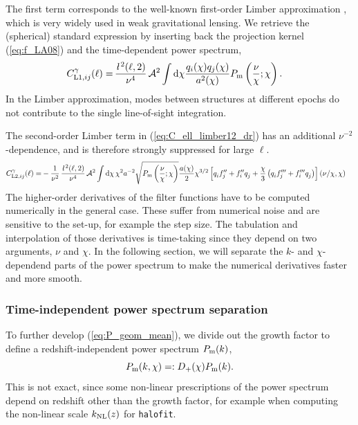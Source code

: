 \documentclass[useAMS,usenatbib]{mn2e} %
\newcommand{\ellbar}{\hbox{\it \l}\,}
\newcommand{\pref}{{\cal A}}
\begin{document}
%
The first term corresponds to the well-known first-order Limber approximation
\cite{1953ApJ...117..134L,1992ApJ...388..272K}, which is very widely used in
weak gravitational lensing. We retrieve the (spherical) standard expression by
inserting back the projection kernel (\ref{eq:f_LA08}) and the time-dependent
power spectrum,
%
\begin{align}
  C^\gamma_{{\rm L1}, ij}(\ell) = & \, \frac{\ellbar^2(\ell, 2)}{\nu^4} \, \pref^2 \int {\rm d} \chi \frac{ q_i(\chi) q_j(\chi) }{a^2(\chi)}
  P_{\rm m}\left(\frac{\nu}{\chi}; \chi\right).
  \label{eq:C_ell_limber1}
\end{align}
%
In the Limber approximation, modes between structures at different epochs do
not contribute to the single line-of-sight integration.

The second-order Limber term in (\ref{eq:C_ell_limber12_dr}) has an additional
$\nu^{-2}$-dependence, and is therefore strongly suppressed for large $\ell$.
%
\begin{align}
  C^\gamma_{{\rm L2}, ij}(\ell) = & - \frac 1 {\nu^2} \, \frac{\ellbar^2(\ell, 2)}{\nu^4} \, \pref^2
    \int {\rm d} \chi \, \chi^{2} a^{-2} \sqrt{P_{\rm m}\left(\frac\nu\chi; \chi\right)}
    \frac{a(\chi)}{2} \chi^{3/2} \left[ q^{}_i f^{\prime\prime}_j + f^{\prime\prime}_i q^{}_j
      + \frac{\chi}{3} \left( q^{}_i f^{\prime\prime\prime}_j + f^{\prime\prime\prime}_i q^{}_j
      \right)
    \right](\nu/\chi, \chi)
  \label{eq:C_ell_limber2_dr} 
\end{align}
%
The higher-order derivatives of the filter functions have to be computed
numerically in the general case. These suffer from numerical noise and are
sensitive to the set-up, for example the step size. The tabulation and
interpolation of those derivatives is time-taking since they depend on two
arguments, $\nu$ and $\chi$. In the following section, we will separate the
$k$- and $\chi$-dependend parts of the power spectrum to make the numerical
derivatives faster and more smooth.

\subsubsection{Time-independent power spectrum separation}

To further develop (\ref{eq:P_geom_mean}), we divide out the growth factor to
define a redshift-independent power spectrum $P_{\rm m}(k)$,
%
\begin{equation}
 P_{\rm m}(k, \chi) =: D_+(\chi) P_{\rm m}(k).
  \label{eq:P_k_chi_sep_s}
\end{equation}
%
This is not exact, since some non-linear prescriptions of the power spectrum
depend on redshift other than the growth factor, for example when computing the
non-linear scale $k_{\rm NL}(z)$ for \texttt{halofit}.
\end{document}
